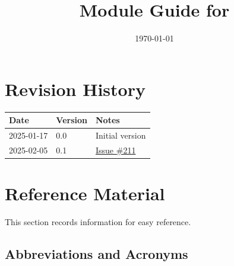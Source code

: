 \documentclass[12pt, titlepage]{article}
\begin{document}
\title{Module Guide for \progname{}} 
\author{\authname}
\date{\today}

\maketitle


\section{Revision History}

\begin{tabularx}{\textwidth}{p{3cm}p{2cm}X}
\toprule {\bf Date} & {\bf Version} & {\bf Notes}\\
\midrule
2025-01-17 & 0.0 & Initial version\\
2025-02-05 & 0.1 & \href{https://github.com/emilyperica/ScoreGen/issues/211}{Issue \#211}\\
\bottomrule
\end{tabularx}

\newpage

\section{Reference Material}

This section records information for easy reference.

\subsection{Abbreviations and Acronyms}
\end{document}
